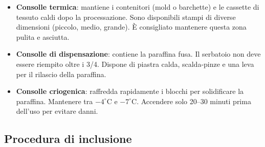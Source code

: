 \begin{itemize}
  \item \textbf{Consolle termica}: mantiene i contenitori (mold o barchette) e le cassette di tessuto caldi dopo la processazione. Sono disponibili stampi di diverse dimensioni (piccolo, medio, grande). È consigliato mantenere questa zona pulita e asciutta.
  
  \item \textbf{Consolle di dispensazione}: contiene la paraffina fusa. Il serbatoio non deve essere riempito oltre i 3/4. Dispone di piastra calda, scalda-pinze e una leva per il rilascio della paraffina.

  \item \textbf{Consolle criogenica}: raffredda rapidamente i blocchi per solidificare la paraffina. Mantenere tra \(-4^\circ\)C e \(-7^\circ\)C. Accendere solo 20–30 minuti prima dell'uso per evitare danni.


\end{itemize}

\subsection{Procedura di inclusione}

